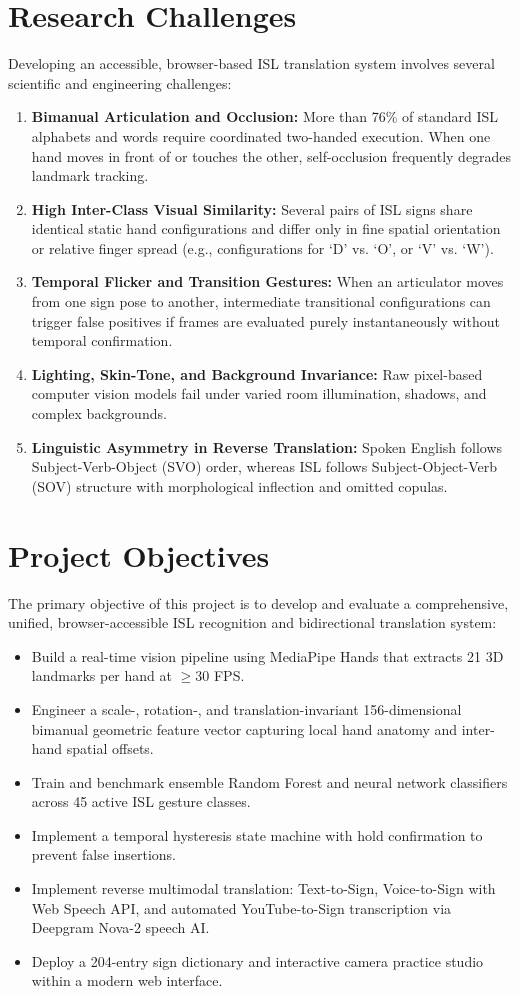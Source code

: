 \section{Research Challenges}
Developing an accessible, browser-based ISL translation system involves several scientific and engineering challenges:
\begin{enumerate}
\item \textbf{Bimanual Articulation and Occlusion:} More than 76\% of standard ISL alphabets and words require coordinated two-handed execution. When one hand moves in front of or touches the other, self-occlusion frequently degrades landmark tracking.
\item \textbf{High Inter-Class Visual Similarity:} Several pairs of ISL signs share identical static hand configurations and differ only in fine spatial orientation or relative finger spread (e.g., configurations for `D' vs. `O', or `V' vs. `W').
\item \textbf{Temporal Flicker and Transition Gestures:} When an articulator moves from one sign pose to another, intermediate transitional configurations can trigger false positives if frames are evaluated purely instantaneously without temporal confirmation.
\item \textbf{Lighting, Skin-Tone, and Background Invariance:} Raw pixel-based computer vision models fail under varied room illumination, shadows, and complex backgrounds.
\item \textbf{Linguistic Asymmetry in Reverse Translation:} Spoken English follows Subject-Verb-Object (SVO) order, whereas ISL follows Subject-Object-Verb (SOV) structure with morphological inflection and omitted copulas.
\end{enumerate}

\section{Project Objectives}
The primary objective of this project is to develop and evaluate a comprehensive, unified, browser-accessible ISL recognition and bidirectional translation system:
\begin{itemize}
\item Build a real-time vision pipeline using MediaPipe Hands that extracts 21 3D landmarks per hand at $\ge 30$ FPS.
\item Engineer a scale-, rotation-, and translation-invariant 156-dimensional bimanual geometric feature vector capturing local hand anatomy and inter-hand spatial offsets.
\item Train and benchmark ensemble Random Forest and neural network classifiers across 45 active ISL gesture classes.
\item Implement a temporal hysteresis state machine with hold confirmation to prevent false insertions.
\item Implement reverse multimodal translation: Text-to-Sign, Voice-to-Sign with Web Speech API, and automated YouTube-to-Sign transcription via Deepgram Nova-2 speech AI.
\item Deploy a 204-entry sign dictionary and interactive camera practice studio within a modern web interface.
\end{itemize}


